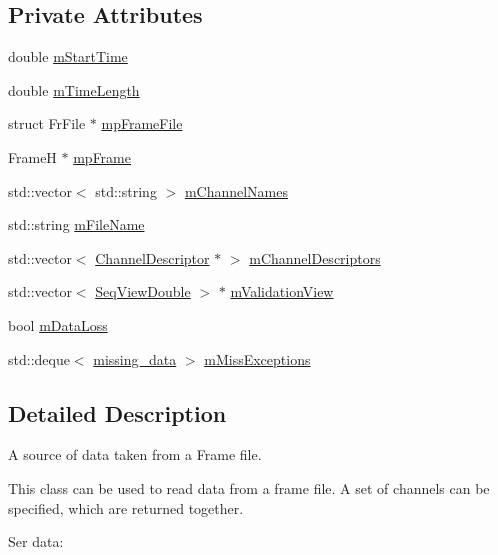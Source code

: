 \subsection*{Private Attributes}
\begin{DoxyCompactItemize}
\item 
double \hyperlink{classtsa_1_1_frame_i_stream_adad4100c6f0691cf47ca247b7b2f0fc6}{m\+Start\+Time}
\item 
double \hyperlink{classtsa_1_1_frame_i_stream_abd897050716a0879d2437a7e4f9f6b38}{m\+Time\+Length}
\item 
struct Fr\+File $\ast$ \hyperlink{classtsa_1_1_frame_i_stream_acee6c81e135c34abb9501753f8088a91}{mp\+Frame\+File}
\item 
FrameH $\ast$ \hyperlink{classtsa_1_1_frame_i_stream_a68ac0c21e3c23a219359e177623cf4e9}{mp\+Frame}
\item 
std\+::vector$<$ std\+::string $>$ \hyperlink{classtsa_1_1_frame_i_stream_a14bff233330be1d0f995551d55b8eb98}{m\+Channel\+Names}
\item 
std\+::string \hyperlink{classtsa_1_1_frame_i_stream_a888a976c4806d295c7ab6731459a0d90}{m\+File\+Name}
\item 
std\+::vector$<$ \hyperlink{classtsa_1_1_channel_descriptor}{Channel\+Descriptor} $\ast$ $>$ \hyperlink{classtsa_1_1_frame_i_stream_aef647c717912f7f4522d98fa967de2a0}{m\+Channel\+Descriptors}
\item 
std\+::vector$<$ \hyperlink{namespacetsa_ac599574bcc094eda25613724b8f3ca9e}{Seq\+View\+Double} $>$ $\ast$ \hyperlink{classtsa_1_1_frame_i_stream_a12d9c0c136ca288fc1fd64a660062494}{m\+Validation\+View}
\item 
bool \hyperlink{classtsa_1_1_frame_i_stream_aef23fdf187cda4ab4a3aaaa0a9ba59ee}{m\+Data\+Loss}
\item 
std\+::deque$<$ \hyperlink{classtsa_1_1missing__data}{missing\+\_\+data} $>$ \hyperlink{classtsa_1_1_frame_i_stream_ab0dfc2d31350678af1d0e1abe165ef65}{m\+Miss\+Exceptions}
\end{DoxyCompactItemize}


\subsection{Detailed Description}
A source of data taken from a Frame file. 

This class can be used to read data from a frame file. A set of channels can be specified, which are returned together.

Ser data\+:

